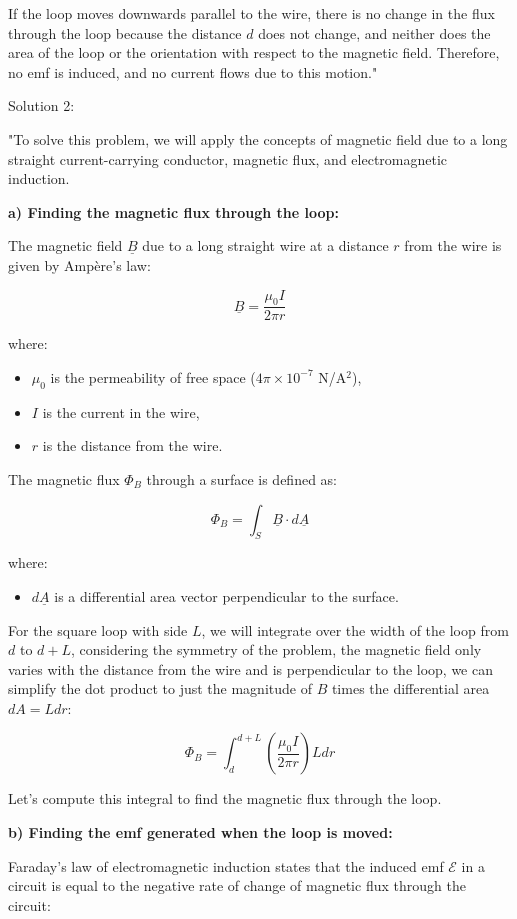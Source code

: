 If the loop moves downwards parallel to the wire, there is no change in the flux through the loop because the distance \( d \) does not change, and neither does the area of the loop or the orientation with respect to the magnetic field. Therefore, no emf is induced, and no current flows due to this motion."

Solution 2:

"To solve this problem, we will apply the concepts of magnetic field due to a long straight current-carrying conductor, magnetic flux, and electromagnetic induction.

\textbf{a) Finding the magnetic flux through the loop:}

The magnetic field $\underline{B}$ due to a long straight wire at a distance $r$ from the wire is given by Ampère's law:

\[
\underline{B} = \frac{\mu_0 I}{2\pi r}
\]

where:
\begin{itemize}
    \item $\mu_0$ is the permeability of free space ($4\pi \times 10^{-7}$ N/A$^2$),
    \item $I$ is the current in the wire,
    \item $r$ is the distance from the wire.
\end{itemize}

The magnetic flux $\Phi_B$ through a surface is defined as:

\[
\Phi_B = \int_S \underline{B} \cdot d\underline{A}
\]

where:
\begin{itemize}
    \item $d\underline{A}$ is a differential area vector perpendicular to the surface.
\end{itemize}

For the square loop with side $L$, we will integrate over the width of the loop from $d$ to $d+L$, considering the symmetry of the problem, the magnetic field only varies with the distance from the wire and is perpendicular to the loop, we can simplify the dot product to just the magnitude of $B$ times the differential area $dA = L dr$:

\[
\Phi_B = \int_{d}^{d+L} \left(\frac{\mu_0 I}{2\pi r}\right) L dr
\]

Let's compute this integral to find the magnetic flux through the loop.

\textbf{b) Finding the emf generated when the loop is moved:}

Faraday's law of electromagnetic induction states that the induced emf $\mathcal{E}$ in a circuit is equal to the negative rate of change of magnetic flux through the circuit:

